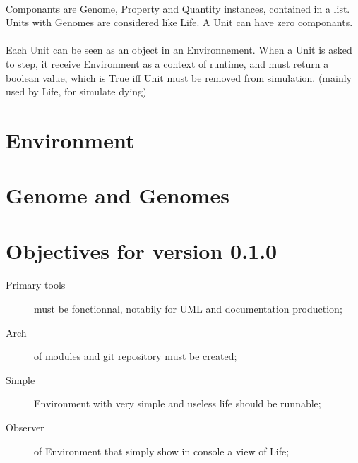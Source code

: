 \documentclass{report} %
\begin{document}
    \paragraph*{}
    Componants are Genome, Property and Quantity instances, contained in a list.
    Units with Genomes are considered like Life.
    A Unit can have zero componants. 
    \paragraph*{}
    Each Unit can be seen as an object in an Environnement.
    When a Unit is asked to step, it receive Environment as a context of runtime, 
    and must return a boolean value, which is True iff Unit must be removed from
    simulation. (mainly used by Life, for simulate dying)



\section*{Environment}



\section*{Genome and Genomes}




    \section*{Objectives for version \textbf{0.1.0}}
    \paragraph*{}
    \begin{description}
        \item[Primary tools] must be fonctionnal, notabily for UML and documentation production;
        \item[Arch] of modules and git repository must be created;
        \item[Simple] Environment with very simple and useless life should be runnable;
        \item[Observer] of Environment that simply show in console a view of Life;
    \end{description}
\end{document}
